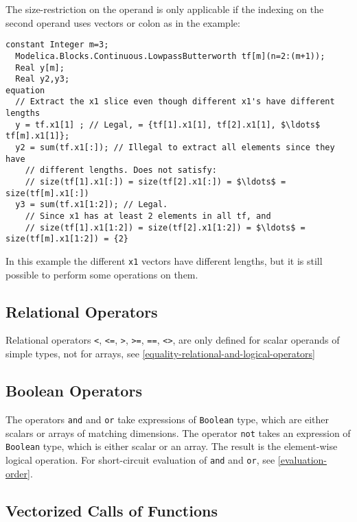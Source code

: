 \begin{example}
The size-restriction on the operand is only applicable if the indexing on the second operand uses vectors or colon as in the example:
\begin{lstlisting}[language=modelica]
  constant Integer m=3;
  Modelica.Blocks.Continuous.LowpassButterworth tf[m](n=2:(m+1));
  Real y[m];
  Real y2,y3;
equation
  // Extract the x1 slice even though different x1's have different lengths
  y = tf.x1[1] ; // Legal, = {tf[1].x1[1], tf[2].x1[1], $\ldots$ tf[m].x1[1]};
  y2 = sum(tf.x1[:]); // Illegal to extract all elements since they have
    // different lengths. Does not satisfy:
    // size(tf[1].x1[:]) = size(tf[2].x1[:]) = $\ldots$ = size(tf[m].x1[:])
  y3 = sum(tf.x1[1:2]); // Legal.
    // Since x1 has at least 2 elements in all tf, and
    // size(tf[1].x1[1:2]) = size(tf[2].x1[1:2]) = $\ldots$ = size(tf[m].x1[1:2]) = {2}
\end{lstlisting}
In this example the different \lstinline!x1! vectors have different lengths,
but it is still possible to perform some operations on them.
\end{example}

\subsection{Relational Operators}\label{relational-operators}

Relational operators \lstinline!<!, \lstinline!<=!, \lstinline!>!,
\lstinline!>=!, \lstinline!==!, \lstinline!<>!, are only defined for
scalar operands of simple types, not for arrays, see \cref{equality-relational-and-logical-operators}

\subsection{Boolean Operators}\label{boolean-operators}

The operators \lstinline!and! and \lstinline!or! take expressions of \lstinline!Boolean! type, which are either scalars or arrays of matching dimensions.  The operator \lstinline!not!
takes an expression of \lstinline!Boolean! type, which is either scalar or an array.  The result is the element-wise logical operation.  For short-circuit evaluation of \lstinline!and!
and \lstinline!or!, see \cref{evaluation-order}.

\subsection{Vectorized Calls of Functions}\label{vectorized-calls-of-functions}

